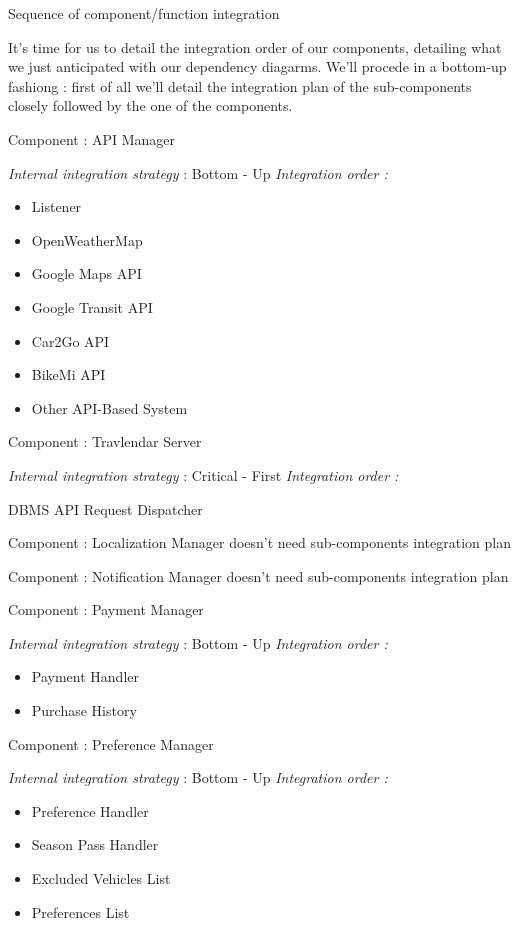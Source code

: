 Sequence of component/function integration

It's time for us to detail the integration order of our components, detailing what we just anticipated with our dependency diagarms.
We'll procede in a bottom-up fashiong : first of all we'll detail the integration plan of the sub-components closely followed by the one of the components.


Component : API Manager

\textit{Internal integration strategy} : Bottom - Up
\textit{Integration order :}
	\begin{itemize}
		\item Listener
		\item OpenWeatherMap
		\item Google Maps API
		\item Google Transit API
		\item Car2Go API
		\item BikeMi API
		\item Other API-Based System
	\end{itemize}


Component : Travlendar Server

\textit{Internal integration strategy} : Critical - First
\textit{Integration order :}
	\begin{itemize}
		\itemize DBMS
		\itemize API Request Dispatcher
	\end{itemize}
	
Component : Localization Manager doesn't need sub-components integration plan

Component : Notification Manager doesn't need sub-components integration plan
	

Component : Payment Manager

\textit{Internal integration strategy} : Bottom - Up
\textit{Integration order :}
	\begin{itemize}
		\item Payment Handler
		\item Purchase History
	\end{itemize}
	
Component : Preference Manager

\textit{Internal integration strategy} : Bottom - Up
\textit{Integration order :}
	\begin{itemize}
	
		\item Preference Handler
		\item Season Pass Handler
		\item Excluded Vehicles List
		\item Preferences List
		
	\end{itemize}
	
